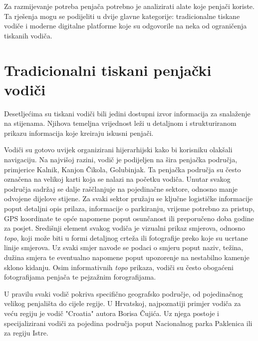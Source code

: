 
Za razmijevanje potreba penjača potrebno je analizirati alate koje penjači koriste. Ta rješenja mogu se podijeliti u dvije glavne kategorije: tradicionalne tiskane vodiče i moderne digitalne platforme koje su odgovorile na neka od ograničenja tiskanih vodiča.

\section{Tradicionalni tiskani penjački vodiči}

Desetljećima su tiskani vodiči bili jedini dostupni izvor informacija za snalaženje na stijenama. Njihova temeljna vrijednost leži u detaljnom i strukturiranom prikazu informacija koje kreiraju iskusni penjači. 

Vodiči su gotovo uvijek organizirani hijerarhijski kako bi korisniku olakšali navigaciju. Na najvišoj razini, vodič je podijeljen na šira penjačka područja, primjerice Kalnik, Kanjon Čikola, Golubinjak. Ta penjačka područja su često označena na velikoj karti koja se nalazi na početku vodiča. Unutar svakog područja sadržaj se dalje raščlanjuje na pojedinačne sektore, odnosno manje odvojene dijelove stijene. Za svaki sektor pružaju se ključne logističke informacije poput detaljni opis prilaza, informacije o parkiranju, vrijeme potrebno za pristup, GPS koordinate te opće napomene poput osunčanost ili preporučeno doba godine za posjet. 
Središnji element svakog vodiča je vizualni prikaz smjerova, odnosno \textit{topo}, koji može biti u formi detaljnog crteža ili fotografije preko koje su ucrtane linije smjerova. Uz svaki smjer navode se podaci o smjeru poput naziv, težina, dužina smjera te eventualno napomene poput upozorenje na nestabilno kamenje sklono kidanju. Osim informativnih \textit{topo} prikaza, vodiči su često obogaćeni fotografijama penjača te pejzažnim forografijama. 


U pravilu svaki vodič pokriva specifično geografsko područje, od pojedinačnog velikog penjališta do cijele regije. U Hrvatskoj, najpoznatiji primjer vodiča za veću regiju je vodič "Croatia" autora Borisa Čujića. Uz njega postoje i specijalizirani vodiči za pojedina područja poput Nacionalnog parka Paklenica ili za regiju Istre.

